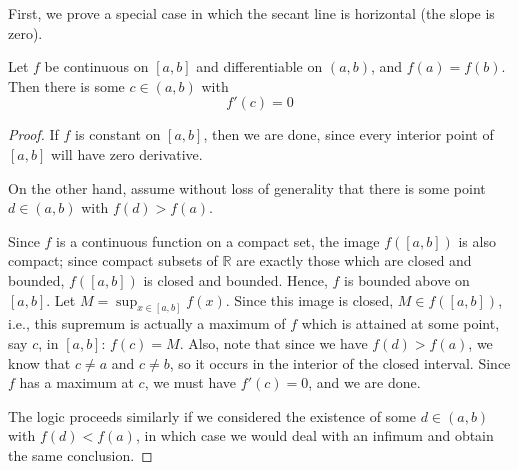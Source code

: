 First, we prove a special case in which the secant line is horizontal (the slope is zero).

\begin{theorem}[Rolle]
Let $f$ be continuous on $\left[a,b\right]$ and differentiable on $\left(a,b\right)$, and $f\left(a\right) = f\left(b\right)$. Then there is some $c\in\left(a,b\right)$ with $$ f'\left(c\right) = 0 $$
\end{theorem}
\begin{proof}
If $f$ is constant on $\left[a,b\right]$, then we are done, since every interior point of $\left[a,b\right]$ will have zero derivative.

On the other hand, assume without loss of generality that there is some point $d \in \left(a,b\right)$ with $f\left(d\right) > f\left(a\right) $. 

Since $f$ is a continuous function on a compact set, the image $f\left(\left[a,b\right]\right)$ is also compact; since compact subsets of $\mathbb{R}$ are exactly those which are closed and bounded, $f\left(\left[a,b\right]\right)$ is closed and bounded. Hence, $f$ is bounded above on $\left[a,b\right]$. Let $M = \sup_{x\in\left[a,b\right]} f\left(x\right) $. Since this image is closed, $M \in f\left(\left[a,b\right]\right)$, i.e., this supremum is actually a maximum of $f$ which is attained at some point, say $c$, in $\left[a,b\right]$: $f\left(c\right) = M$. Also, note that since we have $f\left(d\right) > f\left(a\right)$, we know that $c\neq a$ and $c\neq b$, so it occurs in the interior of the closed interval. Since $f$ has a maximum at $c$, we must have $f'\left(c\right)=0$, and we are done.

The logic proceeds similarly if we considered the existence of some $d\in \left(a,b\right)$ with $f\left(d\right) < f\left(a\right)$, in which case we would deal with an infimum and obtain the same conclusion.
\end{proof}


